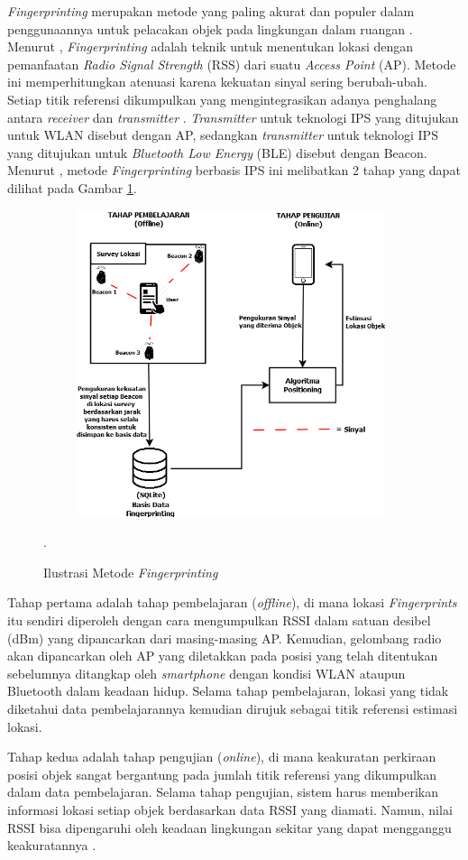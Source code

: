 \textit{Fingerprinting} merupakan metode yang paling akurat dan populer dalam penggunaannya untuk pelacakan objek pada lingkungan dalam ruangan \citep{Yim2010}. Menurut \cite{Muhammad2018}, \textit{Fingerprinting} adalah teknik untuk menentukan lokasi dengan pemanfaatan \textit{Radio Signal Strength} (RSS) dari suatu \textit{Access Point} (AP). Metode ini memperhitungkan atenuasi karena kekuatan sinyal sering berubah-ubah. Setiap titik referensi dikumpulkan yang mengintegrasikan adanya penghalang antara \textit{receiver} dan \textit{transmitter} \citep{Yudha2018}. \textit{Transmitter} untuk teknologi IPS yang ditujukan untuk WLAN disebut dengan AP, sedangkan \textit{transmitter} untuk teknologi IPS yang ditujukan untuk \textit{Bluetooth Low Energy} (BLE) disebut dengan Beacon. Menurut \cite{Yudha2018}, metode \textit{Fingerprinting} berbasis IPS ini melibatkan 2 tahap yang dapat dilihat pada Gambar \ref{fingerprinting}. 

\fancyhf{} 
\fancyfoot[R]{\thepage}

\begin{figure}[H]
\centering
\shadowbox
{\includegraphics [width = 11cm, height= 9cm]{gambar/fingerprinting}}
\caption{Ilustrasi Metode \textit{Fingerprinting} \citep{Yudha2018}}.
\label{fingerprinting}
\end{figure}

\par Tahap pertama adalah tahap pembelajaran (\textit{offline}), di mana lokasi \textit{Fingerprints} itu sendiri diperoleh dengan cara mengumpulkan RSSI dalam satuan desibel (dBm) yang dipancarkan dari masing-masing AP. Kemudian, gelombang radio akan dipancarkan oleh AP yang diletakkan pada posisi yang telah ditentukan sebelumnya ditangkap oleh \textit{smartphone} dengan kondisi WLAN ataupun Bluetooth dalam keadaan hidup. Selama tahap pembelajaran, lokasi yang tidak diketahui data pembelajarannya kemudian dirujuk sebagai titik referensi estimasi lokasi. 
\newline
\par Tahap kedua adalah tahap pengujian (\textit{online}), di mana keakuratan perkiraan posisi objek sangat bergantung pada jumlah titik referensi yang dikumpulkan dalam data pembelajaran. Selama tahap pengujian, sistem harus memberikan informasi lokasi setiap objek berdasarkan data RSSI yang diamati. Namun, nilai RSSI bisa dipengaruhi oleh keadaan lingkungan sekitar yang dapat mengganggu keakuratannya \citep{Subhan2011}.

